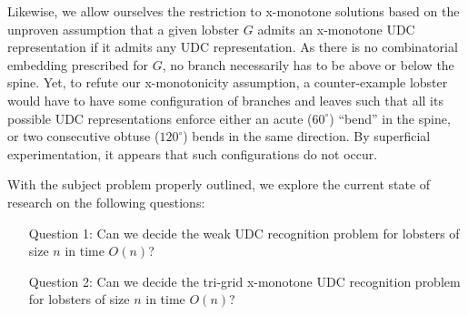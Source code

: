 Likewise, we allow ourselves the restriction to x-monotone solutions based on the unproven assumption that a given lobster $G$ admits an x-monotone UDC representation if it admits any UDC representation. As there is no combinatorial embedding prescribed for $G$, no branch necessarily has to be above or below the spine. Yet, to refute our x-monotonicity assumption, a counter-example lobster would have to have some configuration of branches and leaves such that all its possible UDC representations enforce either an acute ($60^\circ$) ``bend'' in the spine, or two consecutive obtuse ($120^\circ$) bends in the same direction. By superficial experimentation, it appears that such configurations do not occur.

With the subject problem properly outlined, we explore the current state of research on the following questions:

\begin{enumerate}
    \item[Question 1:] Can we decide the weak UDC recognition problem for lobsters of size $n$ in time $O(n)$?
    \item[Question 2:] Can we decide the tri-grid x-monotone UDC recognition problem for lobsters of size $n$ in time $O(n)$?
\end{enumerate}

